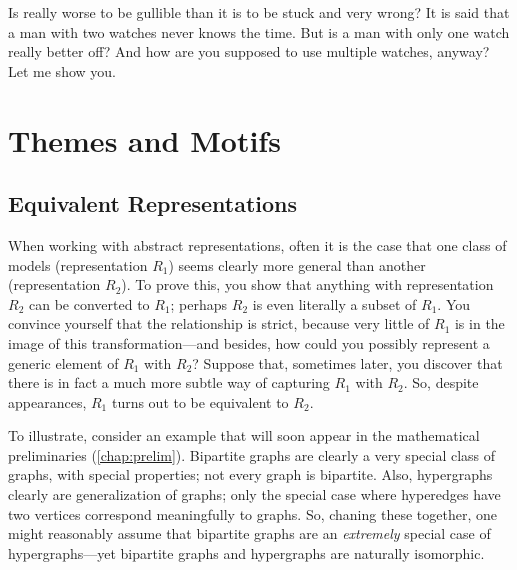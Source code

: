 %
Is really worse to be gullible than it is to be stuck and very wrong? 
It is said that a man with two watches never knows the time.  
But is a man with only one watch really better off?
And how are you supposed to use multiple watches, anyway?
Let me show you. 


\section{Themes and Motifs}



%
\subsection{Equivalent Representations}

When working with abstract representations, often it is the case that one class of models (representation $R_1$) seems clearly more general than another (representation $R_2$).
To prove this, you show that anything with representation $R_2$ can be converted to $R_1$; perhaps $R_2$ is even literally a subset of $R_1$. 
You convince yourself that the relationship is strict, because very little of $R_1$ is in the image of this transformation---and besides, how could you possibly represent a generic element of $R_1$ with $R_2$? 
Suppose that, sometimes later,
 you discover that there is in fact a much more subtle way of capturing $R_1$ with $R_2$. 
So, despite appearances, $R_1$ turns out to be equivalent to $R_2$. 

To illustrate, consider an example that will soon appear in the mathematical preliminaries (\cref{chap:prelim}). 
Bipartite graphs are clearly a very special class of graphs, with special properties; not every graph is bipartite. 
Also, hypergraphs clearly are generalization of graphs; only the special case where hyperedges have two vertices correspond meaningfully to graphs. 
So, chaning these together, one might reasonably assume that bipartite graphs are an \emph{extremely} special case of hypergraphs---yet bipartite graphs and hypergraphs are naturally isomorphic. 




